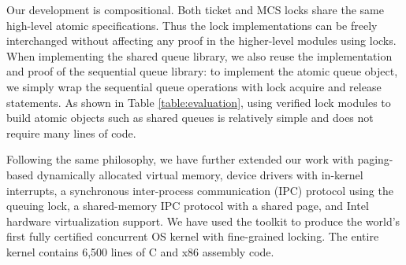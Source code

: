 Our development is compositional. Both ticket  and MCS locks share the same
high-level atomic specifications.
Thus the lock implementations can be freely interchanged without affecting any proof
in the higher-level modules using locks. When implementing the shared queue library, we
also reuse the implementation and proof of the sequential queue library:
to implement the atomic queue object, we simply wrap the
sequential queue operations with lock acquire and release statements.
As shown in Table \ref{table:evaluation}, using verified lock modules to build
atomic objects such as shared queues is relatively simple and does not require
many lines of code.

Following the same philosophy, 
we have further extended our work with paging-based
dynamically allocated virtual
memory, device drivers with in-kernel interrupts, a synchronous inter-process
communication (IPC) protocol using the queuing lock, a shared-memory IPC protocol with
a shared page, and Intel hardware virtualization support.
We have used the toolkit to produce the world's
first fully certified concurrent OS kernel
with fine-grained locking. 
The entire kernel contains 6,500 lines
of C and x86 assembly code.


